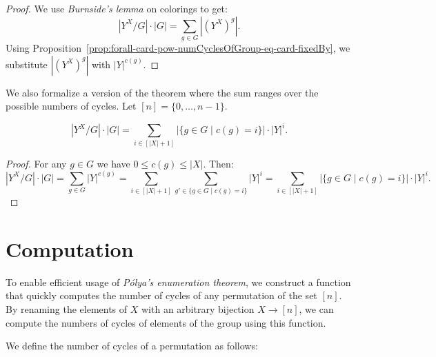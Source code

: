 \begin{proof}
  \leanok
  We use \emph{Burnside's lemma} on colorings to get:
  \begin{equation*}
    |Y^X/G| \cdot |G| = \sum_{g \in G} |(Y^X)^g|.
  \end{equation*}
  Using Proposition~\ref{prop:forall-card-pow-numCyclesOfGroup-eq-card-fixedBy}, we substitute $|(Y^X)^g|$ with $|Y|^{c(g)}$.
\end{proof}

We also formalize a version of the theorem where the sum ranges over the possible numbers of cycles. Let $[n] = \{0, \dots, n - 1\}$.

\begin{theorem}
  \label{prop:numDistinctColorings-mul-card-group-eq-sum-numGroupOfNumCycles-mul-card-pow}
  \leanok
  \begin{equation*}
    |Y^X/G| \cdot |G| = \sum_{i \in [|X| + 1]} |\{g \in G \mid c(g) = i\}| \cdot |Y|^i.
  \end{equation*}
\end{theorem}

\begin{proof}
  \leanok
  For any $g \in G$ we have $0 \leq c(g) \leq |X|$. Then:
  \begin{equation*}
    |Y^X/G| \cdot |G| = \sum_{g \in G} |Y|^{c(g)} = \sum_{i \in [|X| + 1]} \sum_{g' \in \{g \in G \mid c(g) = i\}} |Y|^i = \sum_{i \in [|X| + 1]} |\{g \in G \mid c(g) = i\}| \cdot |Y|^i.
  \end{equation*}
\end{proof}

\section{Computation}

To enable efficient usage of \emph{Pólya's enumeration theorem}, we construct a function that quickly computes the number of cycles of any permutation of the set $[n]$. By renaming the elements of $X$ with an arbitrary bijection $X \to [n]$, we can compute the numbers of cycles of elements of the group using this function.

We define the number of cycles of a permutation as follows:

